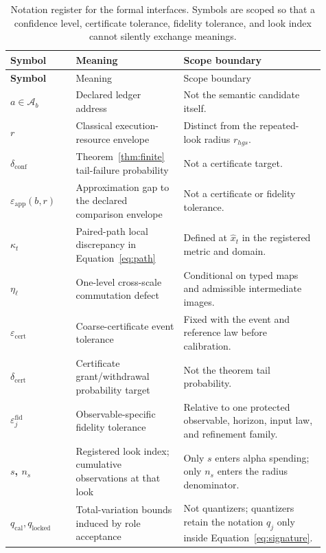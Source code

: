 \begin{longtable}{>{\bfseries}p{0.19\linewidth}p{0.31\linewidth}p{0.41\linewidth}}
\caption{Notation register for the formal interfaces. Symbols are scoped so that a confidence
level, certificate tolerance, fidelity tolerance, and look index cannot silently exchange
meanings.}\label{tab:notation-register}\\
\toprule
Symbol & Meaning & Scope boundary \\
\midrule
\endfirsthead
\toprule
Symbol & Meaning & Scope boundary \\
\midrule
\endhead
\(a\in\mathcal A_b\) & Declared ledger address & Not the semantic candidate itself.\\
\(r\) & Classical execution-resource envelope & Distinct from the repeated-look radius
\(r_{hgs}\).\\
\(\delta_{\mathrm{conf}}\) & Theorem~\ref{thm:finite} tail-failure probability & Not a
certificate target.\\
\(\varepsilon_{\mathrm{app}}(b,r)\) & Approximation gap to the declared comparison envelope &
Not a certificate or fidelity tolerance.\\
\(\kappa_t\) & Paired-path local discrepancy in Equation~\eqref{eq:path} & Defined at
\(\widehat x_t\) in the registered metric and domain.\\
\(\eta_\ell\) & One-level cross-scale commutation defect & Conditional on typed maps and
admissible intermediate images.\\
\(\varepsilon_{\mathrm{cert}}\) & Coarse-certificate event tolerance & Fixed with the event and
reference law before calibration.\\
\(\delta_{\mathrm{cert}}\) & Certificate grant/withdrawal probability target & Not the theorem
tail probability.\\
\(\varepsilon^{\mathrm{fid}}_j\) & Observable-specific fidelity tolerance & Relative to one
protected observable, horizon, input law, and refinement family.\\
\(s\), \(n_s\) & Registered look index; cumulative observations at that look & Only \(s\)
enters alpha spending; only \(n_s\) enters the radius denominator.\\
\(q_{\mathrm{cal}},q_{\mathrm{locked}}\) & Total-variation bounds induced by role acceptance &
Not quantizers; quantizers retain the notation \(q_j\) only inside Equation~\eqref{eq:signature}.\\
\bottomrule
\end{longtable}

